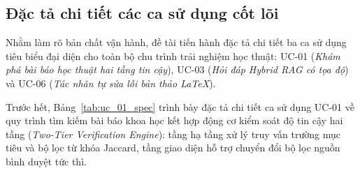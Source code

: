 \subsection{Đặc tả chi tiết các ca sử dụng cốt lõi}
\label{subsec:dac_ta_uc_chi_tiet}
Nhằm làm rõ bản chất vận hành, đề tài tiến hành đặc tả chi tiết ba ca sử dụng tiêu biểu đại diện cho toàn bộ chu trình trải nghiệm học thuật: UC-01 (\textit{Khám phá bài báo học thuật hai tầng tin cậy}), UC-03 (\textit{Hỏi đáp Hybrid RAG có tọa độ}) và UC-06 (\textit{Tác nhân tự sửa lỗi bản thảo \LaTeX}).

Trước hết, Bảng~\ref{tab:uc_01_spec} trình bày đặc tả chi tiết ca sử dụng UC-01 về quy trình tìm kiếm bài báo khoa học kết hợp động cơ kiểm soát độ tin cậy hai tầng (\textit{Two-Tier Verification Engine}): tầng hạ tầng xử lý truy vấn trường mục tiêu và bộ lọc từ khóa Jaccard, tầng giao diện hỗ trợ chuyển đổi bộ lọc nguồn bình duyệt tức thì.

